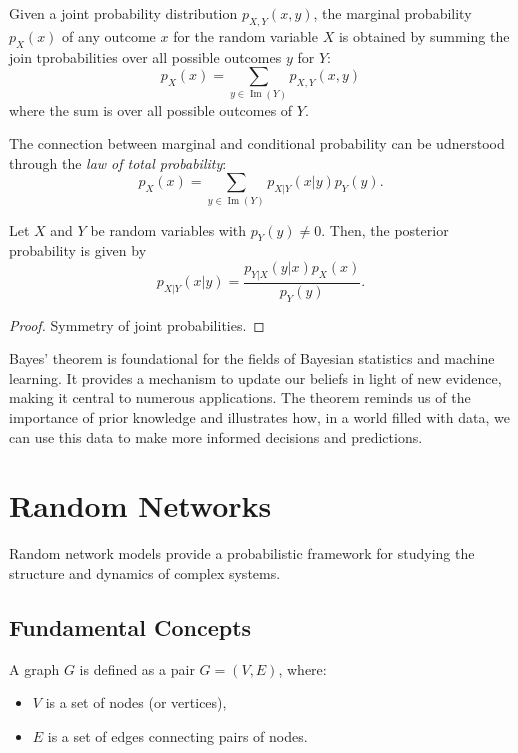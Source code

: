\documentclass[11pt, headings=standardclasses, parskip=half, twoside]{scrartcl}
\newcommand{\im}{\operatorname{Im}}
\begin{document}
\begin{definition}\label{def:marginal}
Given a joint probability distribution \(p_{X,Y}(x,y)\), the marginal probability \(p_X(x)\) of any outcome \(x\) for the random variable \(X\) is obtained by summing the join tprobabilities over all possible outcomes \(y\) for \(Y\):
\[
p_X(x)=\sum_{y \in \im(Y)} p_{X,Y}(x,y)
\]
where the sum is over all possible outcomes of \(Y\).
\end{definition}
The connection between marginal and conditional probability can be udnerstood through the \emph{law of total probability}:
\[
p_X(x)=\sum_{y \in \im(Y)} p_{X|Y}(x|y)p_Y(y) \text{.}
\]


\begin{theorem}\label{thm:bayes}
Let \(X\) and \(Y\) be random variables with \(p_Y(y)\neq 0\). Then, the posterior probability is given by
\[
p_{X|Y}(x|y)=\frac{p_{Y|X}(y|x)p_X(x)}{p_Y(y)}.
\]
\end{theorem}

\begin{proof}
Symmetry of joint probabilities.
\end{proof}

Bayes' theorem is foundational for the fields of Bayesian statistics and machine learning. 
It provides a mechanism to update our beliefs in light of new evidence, making it central to numerous applications.
The theorem reminds us of the importance of prior knowledge and illustrates how, in a world filled with data, we can use this data to make more informed decisions and predictions.


















\clearpage
\section{Random Networks}\label{sec:networks}
Random network models provide a probabilistic framework for studying the structure and dynamics of complex systems.

\subsection{Fundamental Concepts}\label{subsec:graph}
\begin{definition}[Graph]\label{def:graph}
A graph \(G\) is defined as a pair \(G=(V,E)\), where:
\begin{itemize}[before={\parskip = 0em}, nosep]
  \item \(V\) is a set of nodes (or vertices),
  \item \(E\) is a set of edges connecting pairs of nodes. \qedhere
\end{itemize}
\end{definition}
\end{document}
